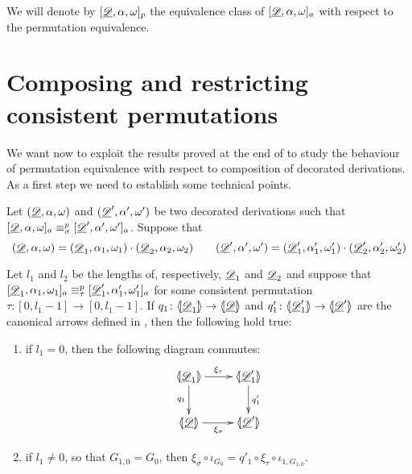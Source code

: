 \begin{notation}
	We will denote by $[\underline{\mathscr{D}}, \alpha, \omega]_p$ the equivalence class of $[\underline{\mathscr{D}}, \alpha, \omega]_a$ with respect to the permutation equivalence.
\end{notation}

\section{Composing and restricting consistent permutations}

We want now to exploit the results proved at the end of  to study the behaviour of permutation equivalence with respect to composition of decorated derivations. As a first step we need to establish some technical points.

\begin{lemma}\label{prop:uniqu}
	Let $(\underline{\mathscr{D}}, \alpha, \omega)$ and $(\underline{\mathscr{D}}', \alpha', \omega')$ be two decorated derivations such that $[\underline{\mathscr{D}}, \alpha, \omega]_a\equiv^p_\sigma [\underline{\mathscr{D}}', \alpha', \omega']_a $. Suppose that 
	\[(\underline{\mathscr{D}}, \alpha, \omega)=(\underline{\mathscr{D}}_1, \alpha_1, \omega_1) \cdot (\underline{\mathscr{D}}_2, \alpha_2, \omega_2) \qquad (\underline{\mathscr{D}}', \alpha', \omega')=(\underline{\mathscr{D}}'_1, \alpha'_1, \omega'_1) \cdot (\underline{\mathscr{D}}'_2, \alpha'_2, \omega'_2) \]
	
	 Let $l_1$ and $l_2$ be the lengths of, respectively, $\underline{\mathscr{D}}_1$ and $\underline{\mathscr{D}}_2$ and suppose that  $[\underline{\mathscr{D}}_1, \alpha_1, \omega_1]_a\equiv^p_\tau [\underline{\mathscr{D}}'_1, \alpha'_1, \omega'_1]_a$ for some consistent permutation $\tau\colon [0, l_1-1]\to [0,l_1-1]$.  If $q_1\colon \langle \hspace{-1.85pt}[ \underline{\mathscr{D}}_1]\hspace{-1.85pt}\rangle \to \langle \hspace{-1.85pt}[ \underline{\mathscr{D}}]\hspace{-1.85pt}\rangle$  and $q'_1\colon \langle \hspace{-1.85pt}[ \underline{\mathscr{D}}'_1]\hspace{-1.85pt}\rangle \to \langle \hspace{-1.85pt}[ \underline{\mathscr{D}}']\hspace{-1.85pt}\rangle$ are the canonical arrows defined in , then the following hold true:
	\begin{enumerate}
	\item  if $l_1=0$, then the following diagram commutes:
		\[\xymatrix{\lpro \der{D}_1\rpro \ar[r]^{\xi_\tau} \ar[d]_{q_1}& \lpro \der{D}'_1 \ar[d]^{q'_1}\rpro\\ \lpro \der{D}\rpro \ar[r]_{\xi_\sigma} & \lpro \der{D}'\rpro } \]
	\item if $l_1\neq 0$, so that $G_{1,0}=G_0$, then $\xi_\sigma \circ \iota_{G_0} = q'_1\circ \xi_{\tau} \circ  \iota_{1, G_{1,0}}$.
	\end{enumerate}
	

\end{lemma}
